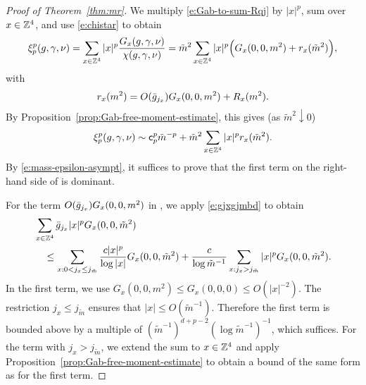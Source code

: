 \begin{proof}[Proof of Theorem~\ref{thm:mr}]
We multiply \eqref{e:Gab-to-sum-Rqj} by $|x|^p$, sum over $x \in {\mathbb Z}^4$,
and use \eqref{e:chistar}
to obtain
\begin{equation}
\xi_p^p(g,\gamma,\nu)
	=
\sum_{x \in {\mathbb Z}^4} |x|^p \frac{G_{x}(g, \gamma, \nu)}{\chi(g, \gamma, \nu)}
	=
\tilde m^2 \sum_{x \in {\mathbb Z}^4} |x|^p \Big(G_{x}(0, 0, m^2) + r_{x}(\tilde m^2) \Big),
\end{equation}
with
\begin{equation}
\lbeq{rx}
    r_x(m^2) = O(\gbar_{j_x})  G_x(0, 0, m^2) + R_{x}(m^2).
\end{equation}
By
Proposition~\ref{prop:Gab-free-moment-estimate},
this gives (as $\tilde m^2 \downarrow 0$)
\begin{equation}
\lbeq{ximasy}
\xi_p^p(g,\gamma,\nu)
	\sim
{\sf c}_p^p \tilde m^{-p} +
\tilde m^2 \sum_{x \in \Z^4} |x|^p r_{x}(\tilde m^2).
\end{equation}
By \eqref{e:mass-epsilon-asympt}, it suffices to prove that
the first term on the right-hand side of  is dominant.

For the term $O(\bar{g}_{j_x}) G_x(0, 0, m^2)$ in ,
we apply \eqref{e:gjxgjmbd} to obtain
\begin{align}
\lbeq{easyerror}
&\sum_{x \in \Z^4} \gbar_{j_x} |x|^p G_x(0, 0, \tilde m^2)
	\nnb & \quad \le
\sum_{x : 0 < j_x \le j_{\tilde m}} \frac{c |x|^p}{\log |x|} G_x(0, 0, \tilde m^2)
	+
\frac{c}{\log \tilde m^{-1}} \sum_{x : j_x >j_{\tilde m}}  |x|^p G_x(0, 0, \tilde m^2).
\end{align}
In the first term,
we use $G_x(0, 0, m^2) \le G_x(0, 0, 0) \le O(|x|^{-2})$.
The restriction $j_x \le j_{\tilde m}$ ensures that $|x| \le O(\tilde m^{-1})$.
Therefore the first term is bounded above by a multiple of
$(\tilde m^{-1})^{d+p-2}(\log \tilde m^{-1})^{-1}$, which suffices.
For the term with $j_x > j_{\tilde m}$, we extend the sum to $x \in {\mathbb Z}^4$
and apply Proposition~\ref{prop:Gab-free-moment-estimate}
to obtain a bound of the same form as for the first term.


\end{proof}

